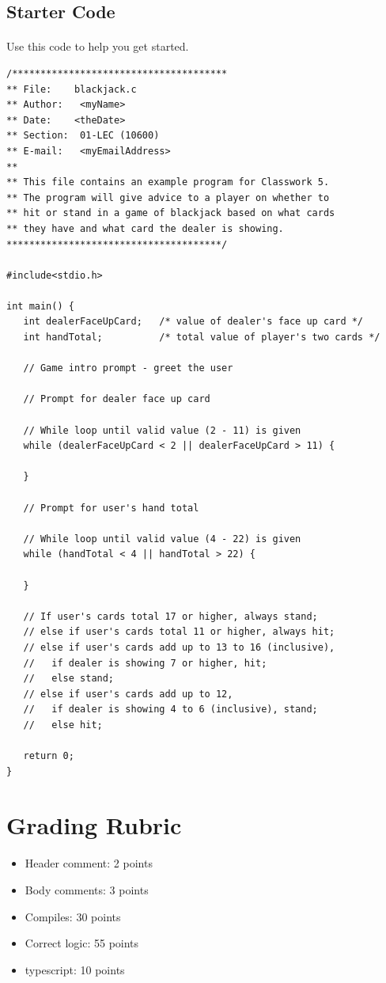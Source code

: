 \documentclass[letter,11pt]{article}
\begin{document}
\subsection*{Starter Code}
\paragraph{}Use this code to help you get started.
\begin{verbatim}
/**************************************
** File:    blackjack.c
** Author:   <myName>
** Date:    <theDate>
** Section:  01-LEC (10600)
** E-mail:   <myEmailAddress>
**
** This file contains an example program for Classwork 5.
** The program will give advice to a player on whether to
** hit or stand in a game of blackjack based on what cards
** they have and what card the dealer is showing.
**************************************/

#include<stdio.h>

int main() {
   int dealerFaceUpCard;   /* value of dealer's face up card */
   int handTotal;          /* total value of player's two cards */

   // Game intro prompt - greet the user

   // Prompt for dealer face up card
   
   // While loop until valid value (2 - 11) is given
   while (dealerFaceUpCard < 2 || dealerFaceUpCard > 11) {
      
   }

   // Prompt for user's hand total
   
   // While loop until valid value (4 - 22) is given
   while (handTotal < 4 || handTotal > 22) {
      
   }

   // If user's cards total 17 or higher, always stand;
   // else if user's cards total 11 or higher, always hit;
   // else if user's cards add up to 13 to 16 (inclusive),
   //   if dealer is showing 7 or higher, hit;
   //   else stand;
   // else if user's cards add up to 12,
   //   if dealer is showing 4 to 6 (inclusive), stand;
   //   else hit;

   return 0;
}
\end{verbatim}

\section*{Grading Rubric}
\begin{itemize}
    \item Header comment: 2 points
    \item Body comments: 3 points
    \item Compiles: 30 points
    \item Correct logic: 55 points
    \item typescript: 10 points
\end{itemize}
\end{document}
